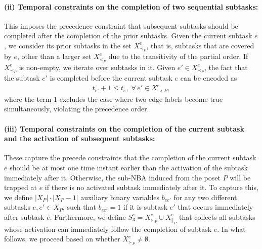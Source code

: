 \documentclass[Afour,sageh,times]{sagej}
\newcounter{mycounter}
\begin{document}
{{{{\paragraph{(ii) Temporal constraints on the completion of two sequential subtasks:}\label{sec:constraintonedge}
This imposes the precedence constraint that subsequent subtasks should be completed after the completion of the prior subtasks.   Given the current subtask $e$, we consider its prior subtasks in the set $X^e_{\prec_{P}}$, that is, subtasks that are covered by $e$, other than a larger set $X^e_{<_{P}}$ due to the transitivity of the partial order.
If $X^e_{\prec_{P}}$ is non-empty, we iterate over subtasks in it.  Given $e' \in X^e_{\prec_{P}}$, the fact that the subtask $e'$ is completed before the current subtask $e$ can be encoded as
\begingroup\makeatletter\def\f@size{10}\check@mathfonts
\def\maketag@@@#1{\hbox{\m@th\normalsize\normalfont#1}}%
\begin{align}\label{eq:12}
  t_{e'} +  1  \leq t_e, \; \forall \, e' \in X_{\prec P}^e,
\end{align}
\endgroup
where the term 1 excludes the case where two edge labels become true simultaneously, violating the precedence order.

\paragraph{(iii)  Temporal constraints on  the  completion of the current subtask and the activation  of subsequent subtasks:}
These capture the precede constraints that the completion of the current subtask $e$ should be at most one time instant earlier than the activation of the subtask immediately after it. Otherwise, the sub-NBA induced from the poset $P$ will be trapped at $e$ if there is no activated subtask immediately after it. To capture this, we define $|X_P|\cdot |X_P -1|$ auxiliary binary variables $b_{ee'}$ for any two different subtasks  $e, e' \in X_P$,  such that $b_{ee'}=1$  if it is subtask $e'$ that occurs immediately after subtask $e$. Furthermore, we define  $S_3^e = X^e_{\succ_{P}} \cup X^e_{\|_{P}}$ that collects all subtasks whose activation can immediately follow the completion of subtask $e$.  In what follows, we proceed based on whether $ X^e_{\succ_{P}} \neq \emptyset$.
}}}}
\end{document}
